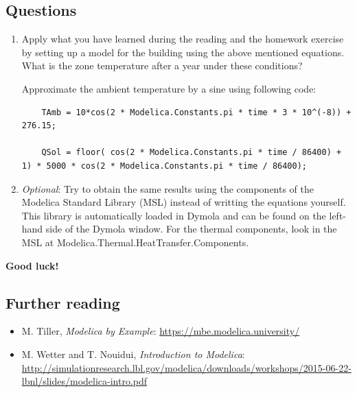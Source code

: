 \documentclass[10pt,a4paper]{article}
\begin{document}
\subsection*{Questions}

\begin{enumerate}
\item Apply what you have learned during the reading and the homework exercise by setting up a model for the building using the above mentioned equations. What is the zone temperature after a year under these conditions?

Approximate the ambient temperature by a sine using following code:
	\begin{lstlisting}
	TAmb = 10*cos(2 * Modelica.Constants.pi * time * 3 * 10^(-8)) + 276.15;
	
	QSol = floor( cos(2 * Modelica.Constants.pi * time / 86400) + 1) * 5000 * cos(2 * Modelica.Constants.pi * time / 86400);
\end{lstlisting}

\item \textit{Optional}: Try to obtain the same results using the components of the Modelica Standard Library (MSL) instead of writting the equations yourself. This library is automatically loaded in Dymola and can be found on the left-hand side of the Dymola window. For the thermal components, look in the MSL at Modelica.Thermal.HeatTransfer.Components.   \linebreak[15]
\end{enumerate}

\begin{center}
 \textbf{Good luck!}
\end{center}
\vspace{10 mm}
\subsection*{Further reading}
\begin{itemize}
	\item M. Tiller, \textit{Modelica by Example}: \url{https://mbe.modelica.university/}
	\item M. Wetter and T. Nouidui, \textit{Introduction to Modelica}: \url{http://simulationresearch.lbl.gov/modelica/downloads/workshops/2015-06-22-lbnl/slides/modelica-intro.pdf}
	
\end{itemize}
\end{document}
